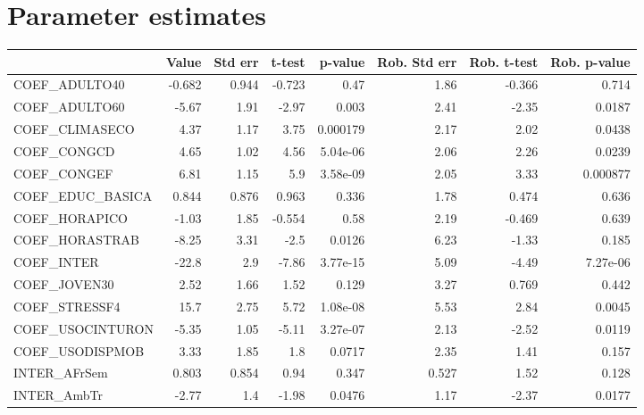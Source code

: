 \section{Parameter estimates}
\begin{tabular}{lrrrrrrr}
\toprule
{} &  Value &  Std err &  t-test &  p-value &  Rob. Std err &  Rob. t-test &  Rob. p-value \\
\midrule
COEF\_ADULTO40      & -0.682 &    0.944 &  -0.723 &     0.47 &          1.86 &       -0.366 &         0.714 \\
COEF\_ADULTO60      &  -5.67 &     1.91 &   -2.97 &    0.003 &          2.41 &        -2.35 &        0.0187 \\
COEF\_CLIMASECO     &   4.37 &     1.17 &    3.75 & 0.000179 &          2.17 &         2.02 &        0.0438 \\
COEF\_CONGCD        &   4.65 &     1.02 &    4.56 & 5.04e-06 &          2.06 &         2.26 &        0.0239 \\
COEF\_CONGEF        &   6.81 &     1.15 &     5.9 & 3.58e-09 &          2.05 &         3.33 &      0.000877 \\
COEF\_EDUC\_BASICA   &  0.844 &    0.876 &   0.963 &    0.336 &          1.78 &        0.474 &         0.636 \\
COEF\_HORAPICO      &  -1.03 &     1.85 &  -0.554 &     0.58 &          2.19 &       -0.469 &         0.639 \\
COEF\_HORASTRAB     &  -8.25 &     3.31 &    -2.5 &   0.0126 &          6.23 &        -1.33 &         0.185 \\
COEF\_INTER         &  -22.8 &      2.9 &   -7.86 & 3.77e-15 &          5.09 &        -4.49 &      7.27e-06 \\
COEF\_JOVEN30       &   2.52 &     1.66 &    1.52 &    0.129 &          3.27 &        0.769 &         0.442 \\
COEF\_STRESSF4      &   15.7 &     2.75 &    5.72 & 1.08e-08 &          5.53 &         2.84 &        0.0045 \\
COEF\_USOCINTURON   &  -5.35 &     1.05 &   -5.11 & 3.27e-07 &          2.13 &        -2.52 &        0.0119 \\
COEF\_USODISPMOB    &   3.33 &     1.85 &     1.8 &   0.0717 &          2.35 &         1.41 &         0.157 \\
INTER\_AFrSem       &  0.803 &    0.854 &    0.94 &    0.347 &         0.527 &         1.52 &         0.128 \\
INTER\_AmbTr        &  -2.77 &      1.4 &   -1.98 &   0.0476 &          1.17 &        -2.37 &        0.0177 \\

\end{tabular}

